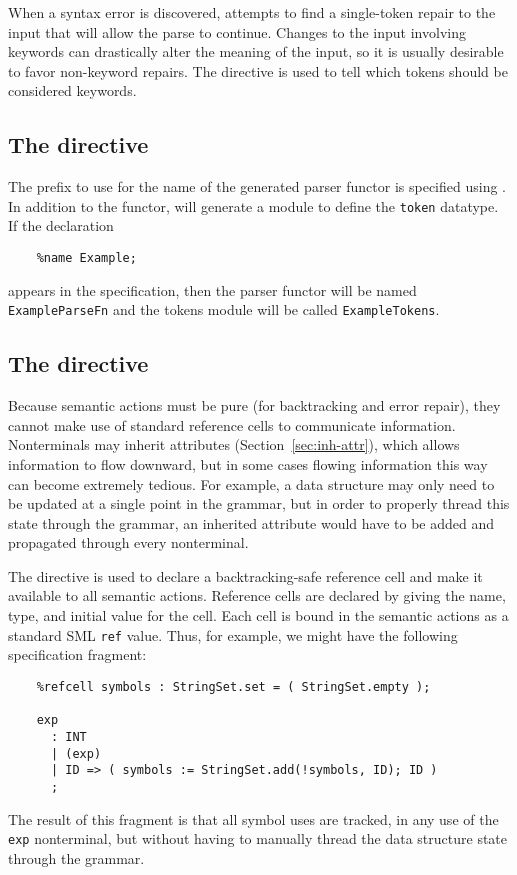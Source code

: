 When a syntax error is discovered, \antlr{} attempts to find a single-token repair to the input that will allow the parse to continue.  Changes to the input involving keywords can drastically alter the meaning of the input, so it is usually desirable to favor non-keyword repairs.  The  directive is used to tell \antlr{} which tokens should be considered keywords.

\subsection{The  directive}

The prefix to use for the name of the generated parser functor is specified using .  In addition to the functor, \antlr{} will generate a module to define the {\tt token} datatype.  If the declaration
\begin{verbatim}
    %name Example;
\end{verbatim}
appears in the specification, then the parser functor will be named {\tt ExampleParseFn} and the tokens module will be called {\tt ExampleTokens}.

\subsection{The  directive}

Because semantic actions must be pure (for backtracking and error repair), they cannot make use of standard reference cells to communicate information.
Nonterminals may inherit attributes (Section~\ref{sec:inh-attr}), which allows information to flow downward, but in some cases flowing information this way can become extremely tedious.
For example, a data structure may only need to be updated at a single point in the grammar, but in order to properly thread this state through the grammar, an inherited attribute would have to be added and propagated through every nonterminal.

The  directive is used to declare a backtracking-safe reference cell and make it available to all semantic actions.  Reference cells are declared by giving the name, type, and initial value for the cell.  Each cell is bound in the semantic actions as a standard SML {\tt ref} value.  Thus, for example, we might have the following specification fragment:
\begin{verbatim}
    %refcell symbols : StringSet.set = ( StringSet.empty );
    
    exp
      : INT
      | (exp)
      | ID => ( symbols := StringSet.add(!symbols, ID); ID )
      ;
\end{verbatim}
The result of this fragment is that all symbol uses are tracked, in any use of the {\tt exp} nonterminal, but without having to manually thread the data structure state through the grammar.

